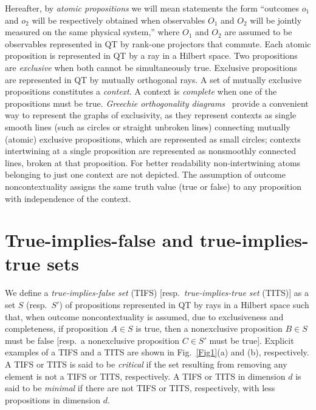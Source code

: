 \documentclass[%
 twocolumn,
 groupedaddress,
 showpacs,
 showkeys,
 preprintnumbers,
 amsmath,amssymb,
 aps,
 pra,
 longbibliography,
 floatfix,
 ]{revtex4-1}
\begin{document}
Hereafter, by {\em atomic propositions} we will mean statements the form ``outcomes $o_1$ and $o_2$ will be respectively obtained when observables $O_1$ and $O_2$ will be jointly measured on the same physical system,'' where $O_1$ and $O_2$ are assumed to be observables represented in QT by rank-one projectors that commute. Each atomic proposition is represented in QT by a ray in a Hilbert space. Two propositions are {\em exclusive} when both cannot be simultaneously true. Exclusive propositions are represented in QT by mutually orthogonal rays. A set of mutually exclusive propositions constitutes a {\em context}. A context is {\em complete} when one of the propositions must be true.
{\em Greechie orthogonality diagrams}~\cite{Greechie71} provide a convenient way to represent the graphs of exclusivity, as they represent contexts as single smooth lines (such as circles or straight unbroken lines) connecting mutually (atomic) exclusive propositions, which are represented as small circles; contexts intertwining
at a single proposition are represented as nonsmoothly connected lines, broken at that proposition. For better readability non-intertwining atoms belonging to just one context are not depicted. The assumption of outcome noncontextuality assigns the same truth value (true or false) to any proposition with independence of the context.


\section{True-implies-false and true-implies-true sets}


We define a {\em true-implies-false set} (TIFS) [resp.\ {\em true-implies-true set} (TITS)] as a set $S$ (resp.\ $S'$) of propositions represented in QT by rays in a Hilbert space such that, when outcome noncontextuality is assumed, due to exclusiveness and completeness, if proposition $A \in S$ is true,
then a nonexclusive proposition $B \in S$ must be false [resp.\ a nonexclusive proposition $C \in S'$ must be true]. Explicit examples of a TIFS and a TITS are shown in Fig.~\ref{Fig1}(a) and (b), respectively. A TIFS or TITS is said to be {\em critical} if the set resulting from removing any element is not a TIFS or TITS, respectively. A TIFS or TITS in dimension $d$ is said to be {\em minimal} if there are not TIFS or TITS, respectively, with less propositions in dimension $d$.
\end{document}
